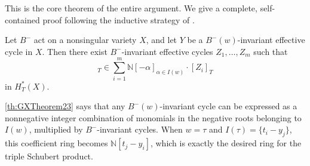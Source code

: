 This is the core theorem of the entire argument. We give a complete, self-contained proof following the inductive strategy of \cite[Section 2]{GX2025}.

\begin{Theorem}\label{th:GXTheorem23}
Let $B^-$ act on a nonsingular variety $X$, and let $Y$ be a $B^-(w)$-invariant effective cycle in $X$. Then there exist $B^-$-invariant effective cycles $Z_1,\ldots,Z_m$ such that
\begin{equation}
[Y]_T \in \sum_{i=1}^m \mathbb{N}[-\alpha]_{\alpha \in I(w)} \cdot [Z_i]_T
\label{eq:GXTheorem23Statement}
\end{equation}
in $H_T^*(X)$.
\end{Theorem}

\cref{th:GXTheorem23} says that any $B^-(w)$-invariant cycle can be expressed as a nonnegative integer combination of monomials in the negative roots belonging to $I(w)$, multiplied by $B^-$-invariant cycles. When $w = \tau$ and $I(\tau) = \{t_i - y_j\}$, this coefficient ring becomes $\mathbb{N}[t_j - y_i]$, which is exactly the desired ring for the triple Schubert product.

